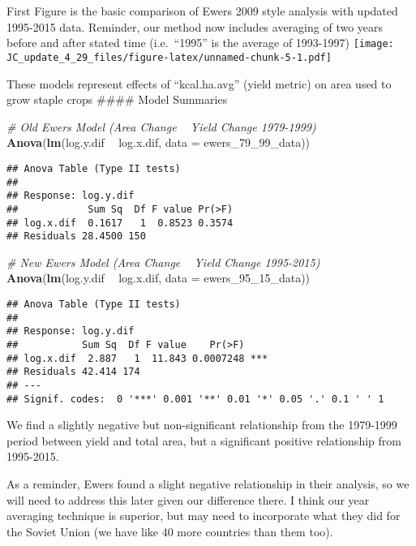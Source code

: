 \documentclass[
]{article}
\newenvironment{Shaded}{\begin{snugshade}}{\end{snugshade}}
\newcommand{\CommentTok}[1]{\textcolor[rgb]{0.56,0.35,0.01}{\textit{#1}}}
\newcommand{\DataTypeTok}[1]{\textcolor[rgb]{0.13,0.29,0.53}{#1}}
\newcommand{\DecValTok}[1]{\textcolor[rgb]{0.00,0.00,0.81}{#1}}
\newcommand{\KeywordTok}[1]{\textcolor[rgb]{0.13,0.29,0.53}{\textbf{#1}}}
\newcommand{\NormalTok}[1]{#1}
\newcommand{\OperatorTok}[1]{\textcolor[rgb]{0.81,0.36,0.00}{\textbf{#1}}}
\newcommand{\StringTok}[1]{\textcolor[rgb]{0.31,0.60,0.02}{#1}}
\begin{document}
First Figure is the basic comparison of Ewers 2009 style analysis with
updated 1995-2015 data. Reminder, our method now includes averaging of
two years before and after stated time (i.e.~``1995'' is the average of
1993-1997)
\texttt{[image: JC\_update\_4\_29\_files/figure-latex/unnamed-chunk-5-1.pdf]}

These models represent effects of ``kcal.ha.avg'' (yield metric) on area
used to grow staple crops \#\#\#\# Model Summaries

\begin{Shaded}
\begin{Highlighting}[]
    \CommentTok{# Old Ewers Model (Area Change ~ Yield Change 1979-1999)}
\KeywordTok{Anova}\NormalTok{(}\KeywordTok{lm}\NormalTok{(log.y.dif }\OperatorTok{~}\StringTok{ }\NormalTok{log.x.dif, }\DataTypeTok{data =}\NormalTok{ ewers_}\DecValTok{79}\NormalTok{_}\DecValTok{99}\NormalTok{_data))}
\end{Highlighting}
\end{Shaded}

\begin{verbatim}
## Anova Table (Type II tests)
## 
## Response: log.y.dif
##            Sum Sq  Df F value Pr(>F)
## log.x.dif  0.1617   1  0.8523 0.3574
## Residuals 28.4500 150
\end{verbatim}

\begin{Shaded}
\begin{Highlighting}[]
    \CommentTok{# New Ewers Model (Area Change ~ Yield Change 1995-2015)}
\KeywordTok{Anova}\NormalTok{(}\KeywordTok{lm}\NormalTok{(log.y.dif }\OperatorTok{~}\StringTok{ }\NormalTok{log.x.dif, }\DataTypeTok{data =}\NormalTok{ ewers_}\DecValTok{95}\NormalTok{_}\DecValTok{15}\NormalTok{_data))}
\end{Highlighting}
\end{Shaded}

\begin{verbatim}
## Anova Table (Type II tests)
## 
## Response: log.y.dif
##           Sum Sq  Df F value    Pr(>F)    
## log.x.dif  2.887   1  11.843 0.0007248 ***
## Residuals 42.414 174                      
## ---
## Signif. codes:  0 '***' 0.001 '**' 0.01 '*' 0.05 '.' 0.1 ' ' 1
\end{verbatim}

We find a slightly negative but non-significant relationship from the
1979-1999 period between yield and total area, but a significant
positive relationship from 1995-2015.

As a reminder, Ewers found a slight negative relationship in their
analysis, so we will need to address this later given our difference
there. I think our year averaging technique is superior, but may need to
incorporate what they did for the Soviet Union (we have like 40 more
countries than them too).
\end{document}
